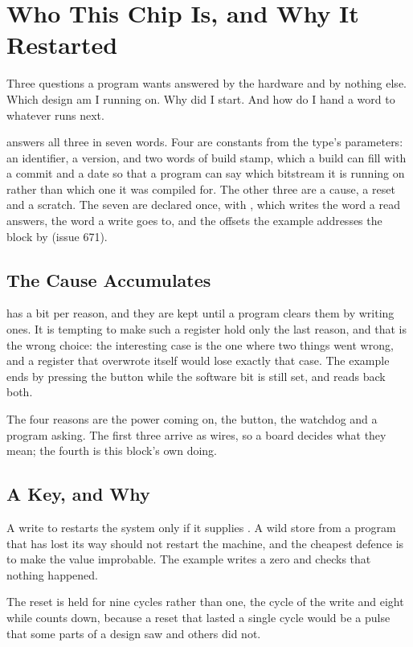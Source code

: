 \section{Who This Chip Is, and Why It Restarted}
\label{sec:x-syscon}

Three questions a program wants answered by the hardware and by
nothing else. Which design am I running on. Why did I start. And how
do I hand a word to whatever runs next.

 answers all three in seven words. Four are constants
from the type's parameters: an identifier, a version, and two words of
build stamp, which a build can fill with a commit and a date so that a
program can say which bitstream it is running on rather than which one
it was compiled for. The other three are a cause, a reset and a
scratch.
The seven are declared once, with , which writes the
word a read answers, the word a write goes to, and the offsets the
example addresses the block by (issue 671).

\subsection{The Cause Accumulates}

 has a bit per reason, and they are kept until a program
clears them by writing ones. It is tempting to make such a register
hold only the last reason, and that is the wrong choice: the
interesting case is the one where two things went wrong, and a
register that overwrote itself would lose exactly that case. The
example ends by pressing the button while the software bit is still
set, and reads back both.

The four reasons are the power coming on, the button, the watchdog
and a program asking. The first three arrive as wires, so a board
decides what they mean; the fourth is this block's own doing.

\subsection{A Key, and Why}

A write to  restarts the system only if it supplies
. A wild store from a program that has lost its way should
not restart the machine, and the cheapest defence is to make the
value improbable. The example writes a zero and checks that nothing
happened.

The reset is held for nine cycles rather than one, the cycle of the
write and eight while  counts down, because a reset
that lasted a single cycle would be a pulse that some parts of a
design saw and others did not.

